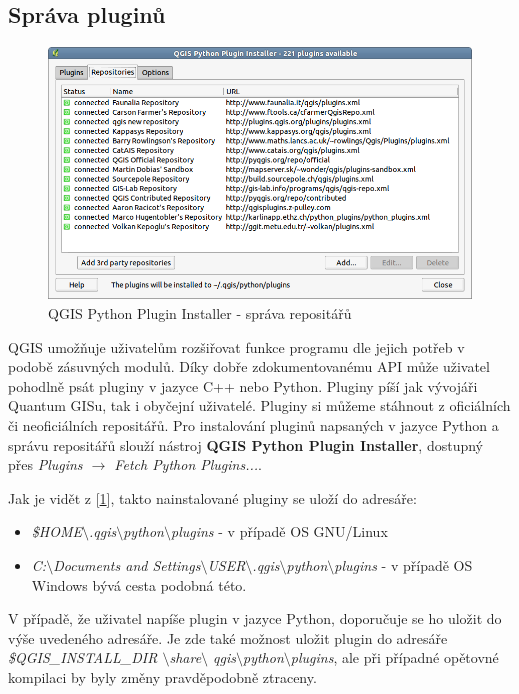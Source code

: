 \subsection{Správa pluginů}
\begin{figure}[h]
	\centering
	\includegraphics[scale=0.5]{pictures/qgis_plugin/python_installer}
	\caption{QGIS Python Plugin Installer - správa repositářů}
  	\label{pythonplugininstaller}
\end{figure}

QGIS umožňuje uživatelům rozšiřovat funkce programu dle jejich potřeb v podobě zásuvných modulů. Díky dobře zdokumentovanému API může uživatel pohodlně psát pluginy v jazyce C++ nebo Python. Pluginy píší jak vývojáři Quantum GISu, tak i obyčejní uživatelé. Pluginy si můžeme stáhnout z oficiálních či neoficiálních repositářů. Pro instalování pluginů napsaných v jazyce Python a správu repositářů slouží nástroj \textbf{QGIS Python Plugin Installer}, dostupný přes \textit{Plugins $\rightarrow$ Fetch Python Plugins...}.

\noindent Jak je vidět z [\figurename \ref{pythonplugininstaller}], takto nainstalované pluginy se uloží do adresáře: 

\begin{itemize}
	\item \textit{\$HOME$\setminus$.qgis$\setminus$python$\setminus$plugins} - v případě OS GNU/Linux
	\item \textit{C:$\setminus$Documents and Settings$\setminus$USER$\setminus$.qgis$\setminus$python$\setminus$plugins} - v případě OS Windows bývá cesta podobná této.
\end{itemize}

V případě, že uživatel napíše plugin v jazyce Python, doporučuje se ho uložit do výše uvedeného adresáře. Je zde také možnost uložit plugin do adresáře \textit{\$QGIS\_INSTALL\_DIR $\setminus$share$\setminus$ qgis$\setminus$python$\setminus$plugins}, ale při případné opětovné kompilaci by byly změny pravděpodobně ztraceny.

